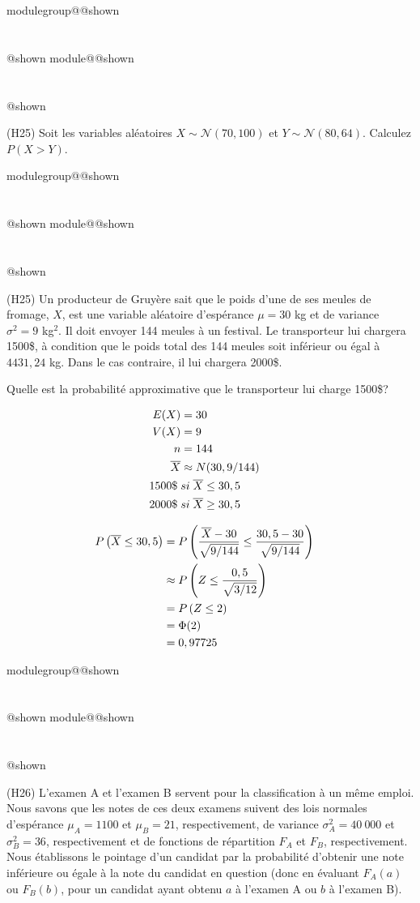 \documentclass{Evaluation}
\makeatletter
\newcommand{\currentmodulekey}{}
\newcommand{\currentmoduletitle}{}
\newcommand{\currentgroupkey}{}
\newcommand{\currentgrouptitle}{}
\newcommand{\showmoduleifneeded}{%
  \ifx\currentgroupkey\empty\else
    \expandafter\ifx\csname modulegroup@\currentgroupkey @shown\endcsname\relax
      \section*{\currentgrouptitle}%
      \expandafter\gdef\csname modulegroup@\currentgroupkey @shown\endcsname{1}%
    \fi
  \fi
  \expandafter\ifx\csname module@\currentmodulekey @shown\endcsname\relax
    \section*{\currentmoduletitle}%
    \expandafter\gdef\csname module@\currentmodulekey @shown\endcsname{1}%
  \fi
}
\newenvironment{H25}{\showmoduleifneeded}{}
\newenvironment{H26}{\showmoduleifneeded}{}
\makeatother
\begin{document}
\begin{questions}
\begin{H25}
\question
(H25) Soit les variables aléatoires $X\sim\mathcal{N}(70, 100)$ et $Y\sim\mathcal{N}(80, 64)$.
Calculez $P(X>Y)$.

\vspace{10cm}
\end{H25}

\begin{H25}
\question
(H25)
Un producteur de Gruyère sait que le poids d'une de ses meules de fromage, $X$, est une variable aléatoire d'espérance $\mu=30$ kg et de variance $\sigma^2 = 9$ kg$^2$. 
Il doit envoyer 144 meules à un festival. 
Le transporteur lui chargera 1500\$, à condition que le poids total des 144 meules soit inférieur ou égal à $4431,24$ kg. 
Dans le cas contraire, il lui chargera 2000\$.

Quelle est la probabilité approximative que le transporteur lui charge 1500\$?
    \vspace{12cm}

\begin{solution}
    \begin{align*}
        E(X) &= 30 \cr
        V(X) &= 9 \cr
        n&= 144 \cr
        \overline{X} &\approx N(30, 9/144) \cr
        1500 \$ \; &si \; \overline{X} \leq 30,5 \cr
        2000 \$ \; &si \; \overline{X} \geq 30,5 
    \end{align*}

    \begin{align*}
        P\left( \overline{X} \leq 30,5 \right)
        &= P\left( \frac{\overline{X}-30}{\sqrt{9/144}} \leq \frac{30,5-30}{\sqrt{9/144}}  \right) \cr
        &\approx P\left( Z \leq \frac{0,5}{\sqrt{3/12}}  \right) \cr
        &= P\left( Z \leq 2 \right) \cr
        &= \Phi(2) \cr
        &= 0,97725
    \end{align*}
\end{solution}
\end{H25}

\begin{H26}
\question
(H26)
L'examen A et l'examen B servent pour la classification à un même emploi. 
Nous savons que les notes de ces deux examens suivent des lois normales d'espérance $\mu_{A}=1100$ et $\mu_{B}=21$, respectivement, de variance $\sigma^2_{A}=40\ 000$ et $\sigma^2_{B}=36$, respectivement et de fonctions de répartition $F_A$ et $F_B$, respectivement.
Nous établissons le pointage d'un candidat par la probabilité d'obtenir une note inférieure ou égale à la note du candidat en question (donc en évaluant $F_A(a)$ ou $F_B(b)$, pour un candidat ayant obtenu $a$ à l'examen A ou $b$ à l'examen B). 


\end{H26}
\end{questions}
\end{document}
